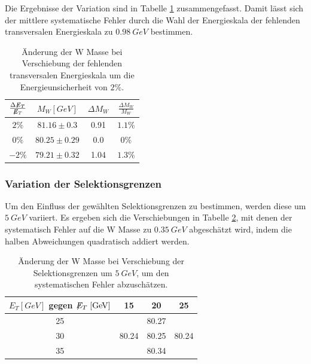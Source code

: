 \documentclass[a4paper,12pt]{article}
\newcommand{\met}{\ensuremath{\not\mathrel{E}}_T}
\begin{document}


Die Ergebnisse der Variation sind in Tabelle \ref{tab:sysmet} zusammengefasst. Damit lässt sich der mittlere systematische Fehler durch die
Wahl der Energieskala der fehlenden transversalen Energieskala zu $\SI{0.98}{GeV}$ bestimmen.
\begin{table}[h]
	\centering
	\begin{tabular}{c| c c c}
		$\frac{\Delta \met}{\met}$ & $M_{W} [\si{GeV}]$ & $\Delta M_{W}$ &$\frac{\Delta M_{W}}{M_{W}}$\\
		\hline
		$2\%$ & $81.16\pm 0.3$ & 0.91 & $1.1\%$\\
		$0\%$ & $80.25\pm 0.29$ & 0.0 & $0\%$ \\
		$-2\%$ & $79.21\pm 0.32$ & 1.04 &$1.3\%$
	\end{tabular}
	\caption{Änderung der W Masse bei Verschiebung der fehlenden transversalen Energieskala um die
	Energieunsicherheit von $2\%$.}
	\label{tab:sysmet}
\end{table}

\subsubsection*{Variation der Selektionsgrenzen}
Um den Einfluss der gewählten Selektionsgrenzen zu bestimmen, werden diese um $\SI{5}{GeV}$
variiert. Es ergeben sich die Verschiebungen in Tabelle \ref{tab:variation}, mit denen der systematisch Fehler
auf die W Masse zu $\SI{0.35}{GeV}$ abgeschätzt wird, indem die halben Abweichungen quadratisch addiert werden.
\begin{table}[h]
	\centering
	\begin{tabular}{c| c c c}
		$E_{T} [\si{GeV}]$ gegen $\met [\si{GeV}]$ & 15 & 20 & 25 \\
		\hline
		25 &  & 80.27 & \\
		30 & 80.24 & 80.25 & 80.24 \\
		35 &  & 80.34 &
	\end{tabular}
	\caption{Änderung der W Masse bei Verschiebung der Selektionsgrenzen um $\SI{5}{GeV}$, um den
systematischen Fehler abzuschätzen.}
	\label{tab:variation}
\end{table}
\end{document}
